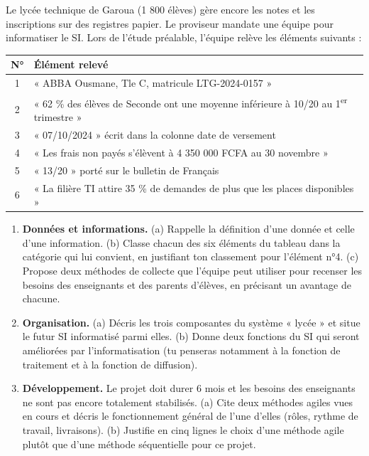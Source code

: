 \documentclass[11pt]{article}
\begin{document}
\begin{exercice}
Le lycée technique de Garoua (1 800 élèves) gère encore les notes et les inscriptions sur des registres papier. Le proviseur mandate une équipe pour informatiser le SI. Lors de l'étude préalable, l'équipe relève les éléments suivants :

\begin{center}
\begin{tabularx}{\linewidth}{|c|X|}
\hline
\rowcolor{popblueL} \textbf{N°} & \textbf{Élément relevé} \\
\hline
1 & « ABBA Ousmane, Tle C, matricule LTG-2024-0157 » \\
\hline
2 & « 62 \% des élèves de Seconde ont une moyenne inférieure à 10/20 au 1\textsuperscript{er} trimestre » \\
\hline
3 & « 07/10/2024 » écrit dans la colonne date de versement \\
\hline
4 & « Les frais non payés s'élèvent à 4 350 000 FCFA au 30 novembre » \\
\hline
5 & « 13/20 » porté sur le bulletin de Français \\
\hline
6 & « La filière TI attire 35 \% de demandes de plus que les places disponibles » \\
\hline
\end{tabularx}
\end{center}

\begin{enumerate}
    \item \textbf{Données et informations.} (a) Rappelle la définition d'une donnée et celle d'une information. (b) Classe chacun des six éléments du tableau dans la catégorie qui lui convient, en justifiant ton classement pour l'élément n°4. (c) Propose deux méthodes de collecte que l'équipe peut utiliser pour recenser les besoins des enseignants et des parents d'élèves, en précisant un avantage de chacune.
    \item \textbf{Organisation.} (a) Décris les trois composantes du système « lycée » et situe le futur SI informatisé parmi elles. (b) Donne deux fonctions du SI qui seront améliorées par l'informatisation (tu penseras notamment à la fonction de traitement et à la fonction de diffusion).
    \item \textbf{Développement.} Le projet doit durer 6 mois et les besoins des enseignants ne sont pas encore totalement stabilisés. (a) Cite deux méthodes agiles vues en cours et décris le fonctionnement général de l'une d'elles (rôles, rythme de travail, livraisons). (b) Justifie en cinq lignes le choix d'une méthode agile plutôt que d'une méthode séquentielle pour ce projet.
\end{enumerate}
\end{exercice}
\end{document}
